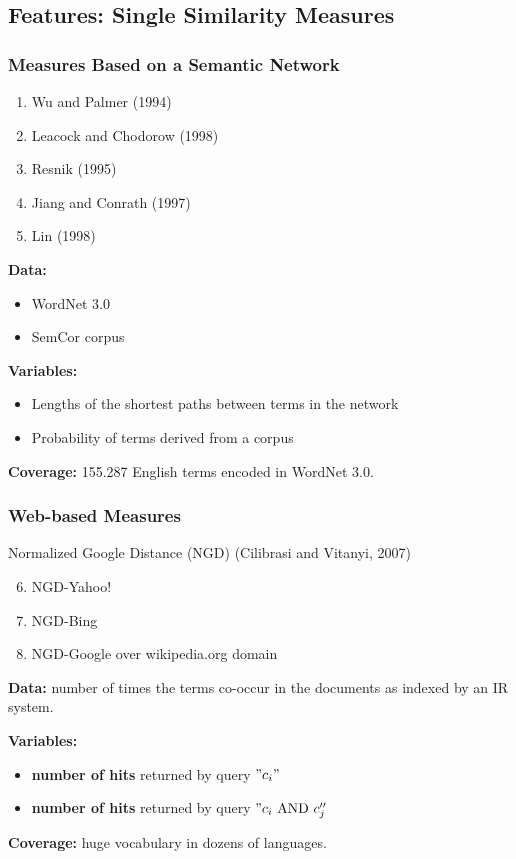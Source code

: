 \documentclass{beamer}
\begin{document}
\subsection{Features: Single Similarity Measures}

\begin{frame}
\frametitle{Measures Based on a Semantic Network}

\begin{enumerate}
  \item Wu and Palmer (1994)
 \item Leacock and Chodorow (1998)
 \item Resnik (1995)
 \item Jiang and Conrath (1997)
 \item Lin (1998)
\end{enumerate}


 \textbf{Data:} 
 \begin{itemize}
   \item WordNet 3.0
   \item SemCor corpus
	
 \end{itemize}
 \textbf{Variables:}
 \begin{itemize}
  \item Lengths of the shortest paths between terms in the network
 \item Probability of terms derived from a corpus
 \end{itemize}
 
 \textbf{Coverage:} 155.287 English terms encoded in WordNet 3.0.
 
\end{frame}

\begin{frame}
\frametitle{Web-based Measures}
	
Normalized Google Distance (NGD) (Cilibrasi and Vitanyi, 2007)

\begin{enumerate}
   \setcounter{enumi}{5}
   \item NGD-Yahoo! 
   \item NGD-Bing 
   \item NGD-Google over wikipedia.org domain     
\end{enumerate}

\textbf{Data:} number of times the terms co-occur in the documents
as indexed by an IR system.

\textbf{Variables:} 

\begin{itemize}
	\item \textbf{number of hits} returned by query $"c_i"$ 
	\item \textbf{number of hits} returned by query $"c_i \text{ AND } c_j''$
\end{itemize}

\textbf{Coverage:} huge vocabulary in dozens of languages.


\end{frame}
\end{document}
